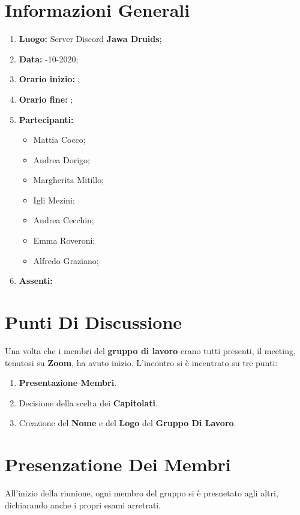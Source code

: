 \newpage
	\chapter{Informazioni Generali}
	\begin{enumerate}
		\item \textbf{Luogo:} \normalfont Server Discord \textbf{Jawa Druids};
		\item \textbf{Data:} -10-2020;
		\item \textbf{Orario inizio:} ;
		\item \textbf{Orario fine:} ;
		\item \textbf{Partecipanti:}
		\begin{itemize}
			\item Mattia Cocco;
			\item Andrea Dorigo;
			\item Margherita Mitillo;
			\item Igli Mezini;
			\item Andrea Cecchin;
			\item Emma Roveroni;
			\item Alfredo Graziano;
		\end{itemize}
		\item \textbf{Assenti:}
	\end{enumerate}
	\newpage
	\chapter{Punti Di Discussione}
	Una volta che i membri del \textbf{gruppo di lavoro} erano tutti presenti, il meeting, tenutosi su \textbf{Zoom}, ha avuto inizio.
	L'incontro si è incentrato su tre punti:
	\begin{enumerate}
		\item \textbf{Presentazione Membri}.		
		\item Decisione della scelta dei \textbf{Capitolati}.
		\item Creazione del \textbf{Nome} e del \textbf{Logo} del \textbf{Gruppo Di Lavoro}.
	\end{enumerate}

	\chapter{Presenzatione Dei Membri}
	All'inizio della riunione, ogni membro del gruppo si è presnetato agli altri, dichiarando anche i propri esami arretrati.

